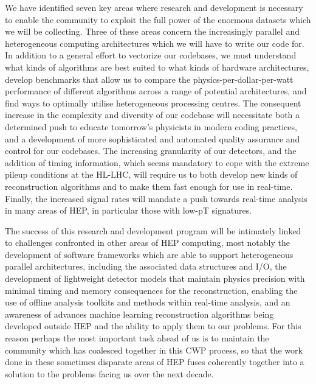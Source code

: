 We have identified seven key areas where research and development is necessary to enable the community to exploit the full power of the enormous datasets which we will be collecting. Three of these areas concern the increasingly parallel and heterogeneous computing architectures which we will have to write our code for. In addition to a general effort to vectorize our codebases, we must understand what kinds of algorithms are best suited to what kinds of hardware architectures, develop benchmarks that allow us to compare the physics-per-dollar-per-watt performance of different algorithms across a range of potential architectures, and find ways to optimally utilise heterogeneous processing centres. The consequent increase in the complexity and diversity of our codebase will necessitate both a determined push to educate tomorrow’s physicists in modern coding practices, and a development of more sophisticated and automated quality assurance and control for our codebases. The increasing granularity of our detectors, and the addition of timing information, which seems mandatory to cope with the extreme pileup conditions at the HL-LHC, will require us to both develop new kinds of reconstruction algorithms and to make them fast enough for use in real-time. Finally, the increased signal rates will mandate a push towards real-time analysis in many areas of HEP, in particular those with low-pT signatures.

The success of this research and development program will be intimately linked to challenges confronted in other areas of HEP computing, most notably the development of software frameworks which are able to support heterogeneous parallel architectures, including the associated data structures and I/O, the development of lightweight detector models that maintain physics precision with minimal timing and memory consequences for the reconstruction, enabling the use of offline analysis toolkits and methods within real-time analysis, and an awareness of advances machine learning reconstruction algorithms being developed outside HEP and the ability to apply them to our problems. For this reason perhaps the most important task ahead of us is to maintain the community which has coalesced together in this CWP process, so that the work done in these sometimes disparate areas of HEP fuses coherently together into a solution to the problems facing us over the next decade.


 

